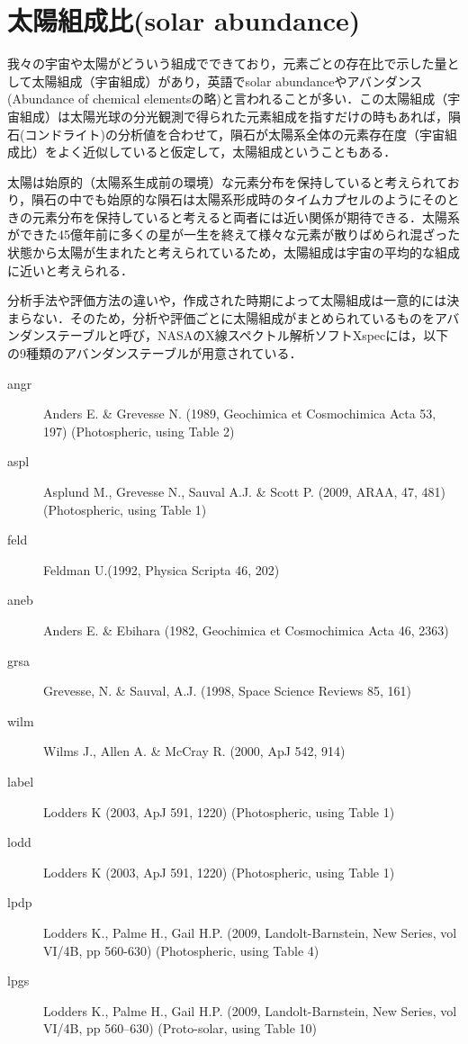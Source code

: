 \section{太陽組成比(solar abundance)}

我々の宇宙や太陽がどういう組成でできており，元素ごとの存在比で示した量として太陽組成（宇宙組成）があり，英語でsolar abundanceやアバンダンス(Abundance of chemical elementsの略)と言われることが多い．この太陽組成（宇宙組成）は太陽光球の分光観測で得られた元素組成を指すだけの時もあれば，隕石(コンドライト)の分析値を合わせて，隕石が太陽系全体の元素存在度（宇宙組成比）をよく近似していると仮定して，太陽組成ということもある．

太陽は始原的（太陽系生成前の環境）な元素分布を保持していると考えられており，隕石の中でも始原的な隕石は太陽系形成時のタイムカプセルのようにそのときの元素分布を保持していると考えると両者には近い関係が期待できる．太陽系ができた45億年前に多くの星が一生を終えて様々な元素が散りばめられ混ざった状態から太陽が生まれたと考えられているため，太陽組成は宇宙の平均的な組成に近いと考えられる．

分析手法や評価方法の違いや，作成された時期によって太陽組成は一意的には決まらない．そのため，分析や評価ごとに太陽組成がまとめられているものをアバンダンステーブルと呼び，NASAのX線スペクトル解析ソフトXspecには，以下の9種類のアバンダンステーブルが用意されている．
\begin{description}
	\item[angr] Anders E. \& Grevesse N. (1989, Geochimica et Cosmochimica Acta 53, 197) (Photospheric, using Table 2)
	\item[aspl] Asplund M., Grevesse N., Sauval A.J. \& Scott P. (2009, ARAA, 47, 481) (Photospheric, using Table 1)
	\item[feld] Feldman U.(1992, Physica Scripta 46, 202)
	\item[aneb] Anders E. \& Ebihara (1982, Geochimica et Cosmochimica Acta 46, 2363)
	\item[grsa] Grevesse, N. \& Sauval, A.J. (1998, Space Science Reviews 85, 161)
	\item[wilm] Wilms J., Allen A. \& McCray R. (2000, ApJ 542, 914)
	\item[label] Lodders K (2003, ApJ 591, 1220) (Photospheric, using Table 1)
	\item[lodd] Lodders K (2003, ApJ 591, 1220) (Photospheric, using Table 1)
	\item[lpdp] Lodders K., Palme H., Gail H.P. (2009, Landolt-Barnstein, New Series, vol VI/4B, pp 560-630) (Photospheric, using Table 4)
	\item[lpgs] Lodders K., Palme H., Gail H.P. (2009, Landolt-Barnstein, New Series, vol VI/4B, pp 560--630) (Proto-solar, using Table 10)
\end{description}

